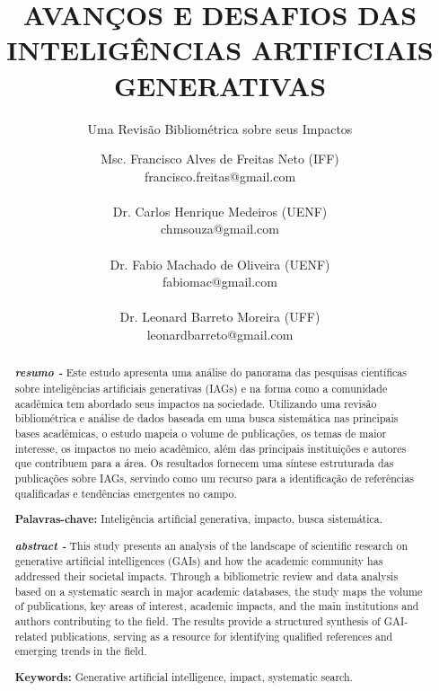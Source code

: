 \documentclass[openany,oneside,a4paper,11pt]{extarticle}
\title{AVANÇOS E DESAFIOS DAS INTELIGÊNCIAS ARTIFICIAIS GENERATIVAS}
\subtitle{Uma Revisão Bibliométrica sobre seus Impactos}
\author{
        Msc. Francisco Alves de Freitas Neto (IFF)\\
        francisco.freitas@gmail.com\\\\
	Dr. Carlos Henrique Medeiros (UENF)\\
        chmsouza@gmail.com\\\\
        Dr. Fabio Machado de Oliveira (UENF)\\
        fabiomac@gmail.com\\\\
        Dr. Leonard Barreto Moreira (UFF)\\
        leonardbarreto@gmail.com
        }
\begin{document}
\maketitle
\normalsize
\renewcommand{\baselinestretch}{1}

\renewcommand{\abstractname}{}    %
\renewcommand{\absnamepos}{empty} %
\begin{abstract}
\noindent \normalsize \textbf{\textit{resumo - }}
Este estudo apresenta uma análise do panorama das pesquisas científicas sobre inteligências artificiais generativas (IAGs) e na forma como a comunidade acadêmica tem abordado seus impactos na sociedade. Utilizando uma revisão bibliométrica e análise de dados baseada em uma busca sistemática nas principais bases acadêmicas, o estudo mapeia o volume de publicações, os temas de maior interesse, os impactos no meio acadêmico, além das principais instituições e autores que contribuem para a área. Os resultados fornecem uma síntese estruturada das publicações sobre IAGs, servindo como um recurso para a identificação de referências qualificadas e tendências emergentes no campo.

\par \vspace{0cm}
    \noindent \textbf{Palavras-chave: }Inteligência artificial generativa, impacto, busca sistemática.

\noindent \normalsize \textbf{\textit{abstract - }}
This study presents an analysis of the landscape of scientific research on generative artificial intelligences (GAIs) and how the academic community has addressed their societal impacts. Through a bibliometric review and data analysis based on a systematic search in major academic databases, the study maps the volume of publications, key areas of interest, academic impacts, and the main institutions and authors contributing to the field. The results provide a structured synthesis of GAI-related publications, serving as a resource for identifying qualified references and emerging trends in the field.

\par \vspace{0cm}
    \noindent \textbf{Keywords: }Generative artificial intelligence, impact, systematic search.
    
\end{abstract} 

\end{document}
